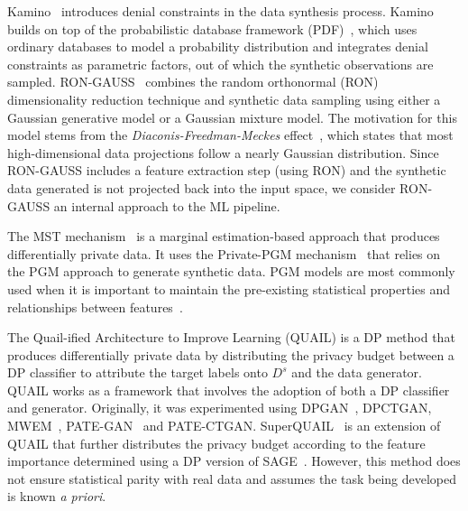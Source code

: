 \documentclass[parskip=full]{scrartcl}
\begin{document}
Kamino~\cite{ge2021kamino} introduces denial constraints in the data synthesis
process. Kamino builds on top of the probabilistic database framework
(PDF)~\cite{de2019formal, suciu2011probabilistic}, which uses ordinary
databases to model a probability distribution and integrates denial
constraints as parametric factors, out of which the synthetic observations are
sampled. RON-GAUSS~\cite{chanyaswad2019ron} combines the random orthonormal
(RON) dimensionality reduction technique and synthetic data sampling using
either a Gaussian generative model or a Gaussian mixture model. The motivation
for this model stems from the \textit{Diaconis-Freedman-Meckes}
effect~\cite{meckes2012projections}, which states that most high-dimensional
data projections follow a nearly Gaussian distribution. Since RON-GAUSS
includes a feature extraction step (using RON) and the synthetic data
generated is not projected back into the input space, we consider RON-GAUSS an
internal approach to the ML pipeline.

The MST mechanism~\cite{mckenna2021winning} is a marginal estimation-based
approach that produces differentially private data. It uses the Private-PGM
mechanism~\cite{mckenna2019graphical} that relies on the PGM approach to
generate synthetic data. PGM models are most commonly used when it is
important to maintain the pre-existing statistical properties and
relationships between features~\cite{young2009using}.

The Quail-ified Architecture to Improve Learning (QUAIL) is a DP method that
produces differentially private data by distributing the privacy budget
between a DP classifier to attribute the target labels onto $D^s$ and the data
generator. QUAIL works as a framework that involves the adoption of both a DP
classifier and generator. Originally, it was experimented using
DPGAN~\cite{xie2018differentially}, DPCTGAN, MWEM~\cite{hardt2012simple},
PATE-GAN~\cite{jordon2018pate} and PATE-CTGAN\@.
SuperQUAIL~\cite{rosenblatt2022spending} is an extension of QUAIL that further
distributes the privacy budget according to the feature importance determined
using a DP version of SAGE~\cite{covert2020understanding}. However, this
method does not ensure statistical parity with real data and assumes the task
being developed is known \textit{a priori}.
\end{document}
